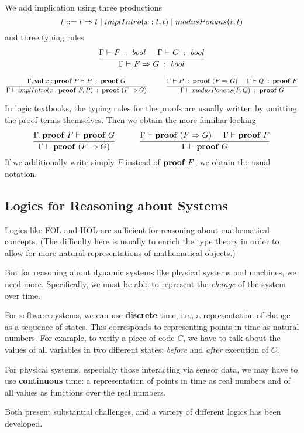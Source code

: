We add implication using three productions
\[t ::= t\Rightarrow t \;|\; implIntro(x:t,t) \;|\; modusPonens(t,t)\]
and three typing rules
\[\cfrac{\Gamma\vdash^{}_{}F\;:\;\mathit{bool}\hspace*{.5cm}\Gamma\vdash^{}_{}G\;:\;\mathit{bool}}{\Gamma\vdash^{}_{}F\Rightarrow G\;:\;\mathit{bool}}\,\]

\[\rul{\oftype{}{\Gamma,\aval{x}{\aproof{F}}{}}{P}{\aproof{G}}}{\oftype{}{\Gamma}{implIntro(x:\aproof{F},P)}{\aproof{(F\impl G)}}}
\tb\tb
\rul{\oftype{}{\Gamma}{P}{\aproof{(F\impl G)}}\tb \oftype{}{\Gamma}{Q}{\aproof{F}}}{\oftype{}{\Gamma}{modusPonens(P,Q)}{\aproof{G}}}\]

In logic textbooks, the typing rules for the proofs are usually written by omitting the proof terms themselves.
Then we obtain the more familiar-looking
\[\rul{\iscons{}{\Gamma,\aproof{F}}{}{\aproof{G}}}{\iscons{}{\Gamma}{}{\aproof{(F\impl G)}}}
\tb\tb
\rul{\iscons{}{\Gamma}{}{\aproof{(F\impl G)}}\tb \iscons{}{\Gamma}{}{\aproof{F}}}{\iscons{}{\Gamma}{}{\aproof{G}}}\]
If we additionally write simply $F$ instead of ${\rm \bf proof}\; F$, we obtain the usual notation.

\subsection{Logics for Reasoning about Systems}

Logics like FOL and HOL are sufficient for reasoning about mathematical concepts.
(The difficulty here is usually to enrich the type theory in order to allow for more natural representations of mathematical objects.)

But for reasoning about dynamic systems like physical systems and machines, we need more.
Specifically, we must be able to represent the \emph{change} of the system over time.

For software systems, we can use \textbf{discrete} time, i.e., a representation of change as a sequence of states.
This corresponds to representing points in time as natural numbers.
For example, to verify a piece of code $C$, we have to talk about the values of all variables in two different states: \emph{before} and \emph{after} execution of $C$.

For physical systems, especially those interacting via sensor data, we may have to use \textbf{continuous} time: a representation of points in time as real numbers and of all values as functions over the real numbers.

Both present substantial challenges, and a variety of different logics has been developed.

